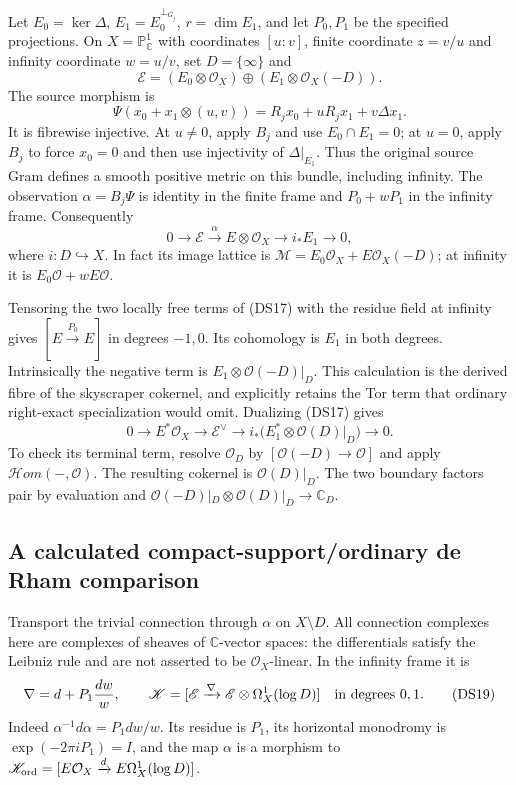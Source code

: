 \documentclass{article}
\begin{document}
Let $E_0=\ker\Delta$, $E_1=E_0^{\perp_{G_j}}$, $r=\dim E_1$, and
let $P_0,P_1$ be the specified projections.  On
$X=\mathbb P^1_{\mathbb C}$ with coordinates $[u:v]$, finite coordinate
$z=v/u$ and infinity coordinate $w=u/v$, set $D=\{\infty\}$ and
\[
 \mathscr E=(E_0\otimes\mathcal O_X)
 \oplus(E_1\otimes\mathcal O_X(-D)).
 \tag{DS15}
\]
The source morphism is
\[
 \Psi(x_0+x_1\otimes(u,v))
 =R_jx_0+uR_jx_1+v\Delta x_1.
 \tag{DS16}
\]
It is fibrewise injective.  At $u\ne0$, apply $B_j$ and use
$E_0\cap E_1=0$; at $u=0$, apply $B_j$ to force $x_0=0$ and then
use injectivity of $\Delta|_{E_1}$.  Thus the original source Gram
defines a smooth positive metric on this bundle, including infinity.
The observation $\alpha=B_j\Psi$ is identity in the finite frame and
$P_0+wP_1$ in the infinity frame.  Consequently
\[
 0\to\mathscr E\xrightarrow{\alpha}E\otimes\mathcal O_X
 \to i_*E_1\to0,
 \tag{DS17}
\]
where $i:D\hookrightarrow X$.  In fact its image lattice is
$\mathcal M=E_0\mathcal O_X+E\mathcal O_X(-D)$; at infinity it is
$E_0\mathcal O+wE\mathcal O$.

Tensoring the two locally free terms of (DS17) with the residue field
at infinity gives $[E\xrightarrow{P_0}E]$ in degrees $-1,0$.
Its cohomology is $E_1$ in both degrees.  Intrinsically the negative
term is $E_1\otimes\mathcal O(-D)|_D$.  This calculation is the
derived fibre of the skyscraper cokernel, and explicitly retains the
Tor term that ordinary right-exact specialization would omit.
Dualizing (DS17) gives
\[
 0\to E^*\mathcal O_X\to\mathscr E^\vee
 \to i_*\bigl(E_1^*\otimes\mathcal O(D)|_D\bigr)\to0.
 \tag{DS18}
\]
To check its terminal term, resolve $\mathcal O_D$ by
$[\mathcal O(-D)\to\mathcal O]$ and apply $\mathcal Hom(-,\mathcal O)$.
The resulting cokernel is $\mathcal O(D)|_D$.
The two boundary factors pair by evaluation and
$\mathcal O(-D)|_D\otimes\mathcal O(D)|_D\to\mathbb C_D$.

\subsection{A calculated compact-support/ordinary de Rham comparison}

Transport the trivial connection through $\alpha$ on $X\setminus D$.
All connection complexes here are complexes of sheaves of
$\mathbb C$-vector spaces: the differentials satisfy the Leibniz
rule and are not asserted to be $\mathcal O_X$-linear.
In the infinity frame it is
\[
 \nabla=d+P_1\frac{dw}{w},\qquad
 \mathscr K=[\mathscr E\xrightarrow{\nabla}
                 \mathscr E\otimes\Omega_X^1(\log D)]
 \quad\hbox{in degrees }0,1.
 \tag{DS19}
\]
Indeed $\alpha^{-1}d\alpha=P_1dw/w$.  Its residue is $P_1$, its
horizontal monodromy is $\exp(-2\pi iP_1)=I$, and the map $\alpha$
is a morphism to
$\mathscr K_{\rm ord}=[E\mathcal O_X\xrightarrow d
E\Omega_X^1(\log D)]$.
\end{document}
